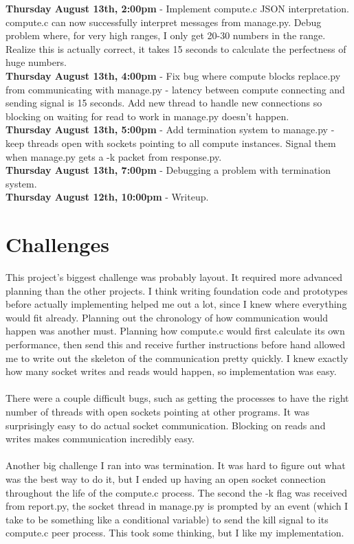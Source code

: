\documentclass[11pt]{article}
\begin{document}
\textbf{Thursday August 13th, 2:00pm} - Implement compute.c JSON interpretation. compute.c can now successfully interpret messages from manage.py. Debug problem where, for very high ranges, I only get 20-30 numbers in the range. Realize this is actually correct, it takes 15 seconds to calculate the perfectness of huge numbers.\\
\textbf{Thursday August 13th, 4:00pm} - Fix bug where compute blocks replace.py from communicating with manage.py - latency between compute connecting and sending signal is 15 seconds. Add new thread to handle new connections so blocking on waiting for read to work in manage.py doesn't happen.\\
\textbf{Thursday August 13th, 5:00pm} - Add termination system to manage.py - keep threads open with sockets pointing to all compute instances. Signal them when manage.py gets a -k packet from response.py.\\
\textbf{Thursday August 13th, 7:00pm} - Debugging a problem with termination system.\\
\textbf{Thursday August 12th, 10:00pm} - Writeup.\\

\section{Challenges}
This project's biggest challenge was probably layout. It required more advanced planning than the other projects. I think writing foundation code and prototypes before actually implementing helped me out a lot, since I knew where everything would fit already. Planning out the chronology of how communication would happen was another must. Planning how compute.c would first calculate its own performance, then send this and receive further instructions before hand allowed me to write out the skeleton of the communication pretty quickly. I knew exactly how many socket writes and reads would happen, so implementation was easy.\\ \\
There were a couple difficult bugs, such as getting the processes to have the right number of threads with open sockets pointing at other programs. It was surprisingly easy to do actual socket communication. Blocking on reads and writes makes communication incredibly easy.\\ \\
Another big challenge I ran into was termination. It was hard to figure out what was the best way to do it, but I ended up having an open socket connection throughout the life of the compute.c process. The second the -k flag was received from report.py, the socket thread in manage.py is prompted by an event (which I take to be something like a conditional variable) to send the kill signal to its compute.c peer process. This took some thinking, but I like my implementation.\\ \\
\end{document}

